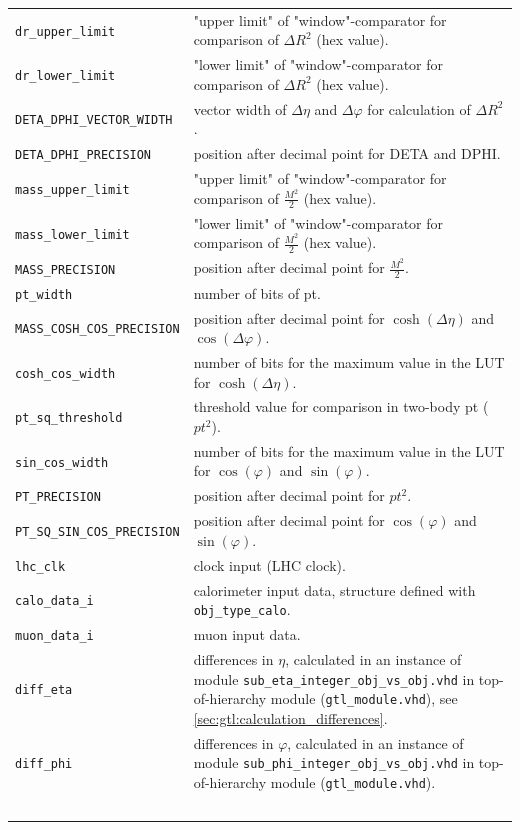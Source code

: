 \begin{longtable}{>{\footnotesize}l >{\footnotesize}p{}}
\verb|dr_upper_limit| & "upper limit" of "window"-comparator for comparison of $\Delta$$R^2$ (hex value).\\
\verb|dr_lower_limit| & "lower limit" of "window"-comparator for comparison of $\Delta$$R^2$ (hex value).\\
\verb|DETA_DPHI_VECTOR_WIDTH| & vector width of $\Delta\eta$ and $\Delta\varphi$ for calculation of $\Delta$$R^2$.\\
\verb|DETA_DPHI_PRECISION| & position after decimal point for DETA and DPHI.\\
\verb|mass_upper_limit| & "upper limit" of "window"-comparator for comparison of $\frac{M^2}{2}$ (hex value).\\
\verb|mass_lower_limit| & "lower limit" of "window"-comparator for comparison of $\frac{M^2}{2}$ (hex value).\\
\verb|MASS_PRECISION| & position after decimal point for $\frac{M^2}{2}$.\\
\verb|pt_width| & number of bits of pt.\\
\verb|MASS_COSH_COS_PRECISION| & position after decimal point for $\cosh(\Delta\eta)$ and $\cos(\Delta\varphi)$.\\
\verb|cosh_cos_width| & number of bits for the maximum value in the LUT for $\cosh(\Delta\eta)$.\\
\verb|pt_sq_threshold| & threshold value for comparison in two-body pt (${pt^2}$).\\
\verb|sin_cos_width| & number of bits for the maximum value in the LUT for $\cos(\varphi)$ and $\sin(\varphi)$.\\
\verb|PT_PRECISION| & position after decimal point for ${pt^2}$.\\
\verb|PT_SQ_SIN_COS_PRECISION| & position after decimal point for $\cos(\varphi)$ and $\sin(\varphi)$.\\
\verb|lhc_clk| & clock input (LHC clock).\\
\verb|calo_data_i| & calorimeter input data, structure defined with \texttt{obj\_type\_calo}.\\
\verb|muon_data_i| & muon input data.\\
\verb|diff_eta| & differences in $\eta$, calculated in an instance of module \texttt{sub\_eta\_integer\_obj\_vs\_obj.vhd} in top-of-hierarchy module (\texttt{gtl\_module.vhd}), see \ref{sec:gtl:calculation_differences}.\\
\verb|diff_phi| & differences in $\varphi$, calculated in an instance of module \texttt{sub\_phi\_integer\_obj\_vs\_obj.vhd} in top-of-hierarchy module (\texttt{gtl\_module.vhd}).\\
$$
\end{longtable}
